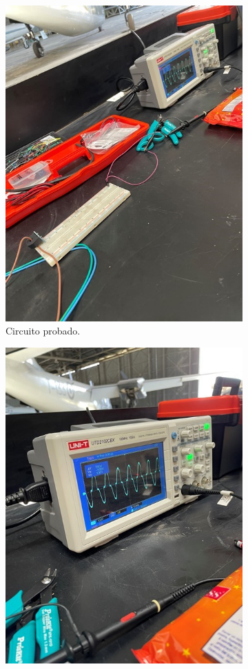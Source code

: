\begin{figure}[H]

\begin{subfigure}{0.5\textwidth}
\includegraphics[width=0.9\linewidth]{informes/IMG_7659.jpg} 
\caption{Circuito probado.}
\end{subfigure}
\begin{subfigure}{0.5\textwidth}
\includegraphics[width=0.9\linewidth]{informes/IMG_7660.jpg}

\end{subfigure}
\end{figure}
